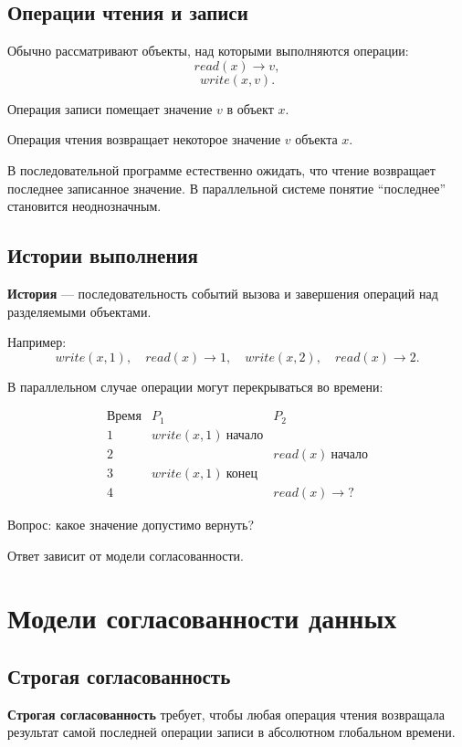\documentclass[12pt,a4paper]{article}
\begin{document}
\subsection{Операции чтения и записи}

Обычно рассматривают объекты, над которыми выполняются операции:
\[
read(x) \rightarrow v,
\]
\[
write(x, v).
\]

Операция записи помещает значение $v$ в объект $x$.

Операция чтения возвращает некоторое значение $v$ объекта $x$.

В последовательной программе естественно ожидать, что чтение возвращает последнее записанное значение. В параллельной системе понятие ``последнее'' становится неоднозначным.

\subsection{Истории выполнения}

\textbf{История} --- последовательность событий вызова и завершения операций над разделяемыми объектами.

Например:
\[
write(x,1),\quad read(x)\rightarrow 1,\quad write(x,2),\quad read(x)\rightarrow 2.
\]

В параллельном случае операции могут перекрываться во времени:

\[
\begin{array}{c|c|c}
\text{Время} & P_1 & P_2 \\
\hline
1 & write(x,1)\ \text{начало} & \\
2 & & read(x)\ \text{начало} \\
3 & write(x,1)\ \text{конец} & \\
4 & & read(x)\rightarrow ?
\end{array}
\]

Вопрос: какое значение допустимо вернуть?

Ответ зависит от модели согласованности.

\section{Модели согласованности данных}

\subsection{Строгая согласованность}

\textbf{Строгая согласованность} требует, чтобы любая операция чтения возвращала результат самой последней операции записи в абсолютном глобальном времени.
\end{document}
